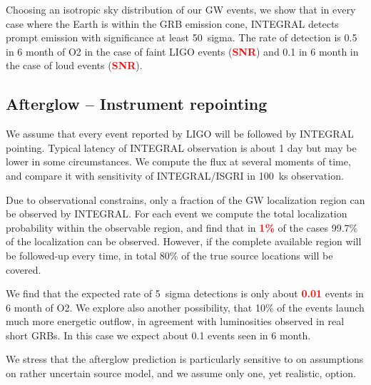 \documentclass[a0,portrait]{a0poster}
\newcommand{\vs}[1] {\textbf{\textcolor{red}{#1}}}
\begin{document}
\begin{multicols}{2}
\begin{center}
    \label{covered_region}
\end{center}

Choosing an isotropic sky distribution of our GW events, we show that
in every case where the Earth is within the GRB emission cone,
INTEGRAL detects prompt emission with significance at least 50~sigma.
The rate of detection is 0.5 in 6 month of O2 in the case of faint
LIGO events (\vs{SNR}) and 0.1 in 6 month in the case of loud events
(\vs{SNR}).

\subsection*{Afterglow -- Instrument repointing}

We assume that every event reported by LIGO will be followed by
INTEGRAL pointing. Typical latency of INTEGRAL observation is about 1
day but may be lower in some circumstances. We compute the flux at
several moments of time, and compare it with sensitivity of
INTEGRAL/ISGRI in 100~ks observation.

Due to observational constrains, only a fraction of the GW localization
region can be observed by INTEGRAL. For each event we compute the
total localization probability within the observable region, and find
that in \vs{1\%} of the cases 99.7\% of the localization can be
observed. However, if the complete available region will be followed-up
every time, in total 80\% of the true source locations will be
covered.

We find that the expected rate of 5~sigma detections is only about
\vs{0.01} events in 6 month of O2. We explore also another
possibility, that 10\% of the events launch much more energetic
outflow, in agreement with luminosities observed in real short
GRBs. In this case we expect about 0.1 events seen in 6 month. 

We stress that the afterglow prediction is particularly sensitive to
on assumptions on rather uncertain source model, and we assume only
one, yet realistic, option.


\end{multicols}
\end{document}
